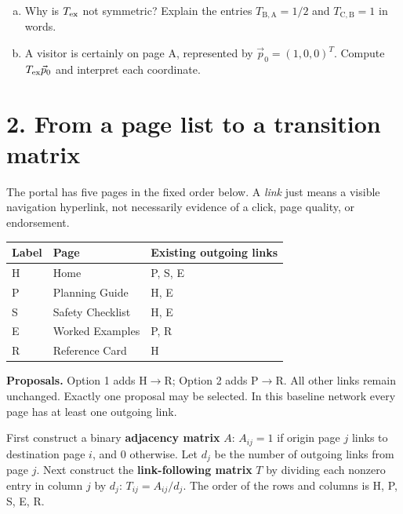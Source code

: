 \documentclass[10pt,letterpaper]{article}
\begin{document}
\begin{enumerate}[a.,leftmargin=*]
\item Why is $T_{\rm ex}$ not symmetric? Explain the entries $T_{\mathrm{B},\mathrm{A}}=1/2$ and $T_{\mathrm{C},\mathrm{B}}=1$ in words.\\[0.36in]
\item A visitor is certainly on page A, represented by $\vec p_0=(1,0,0)^T$. Compute $T_{\rm ex}\vec p_0$ and interpret each coordinate.\\[0.36in]
\end{enumerate}

\newpage
\section*{2. From a page list to a transition matrix}
The portal has five pages in the fixed order below. A \emph{link} just means a visible navigation hyperlink, not necessarily evidence of a click, page quality, or endorsement.
\begin{center}
\begin{tabularx}{\linewidth}{@{}p{0.48in}p{1.55in}Y@{}}
\toprule
Label & Page & Existing outgoing links\\
\midrule
H & Home & P, S, E\\
P & Planning Guide & H, E\\
S & Safety Checklist & H, E\\
E & Worked Examples & P, R\\
R & Reference Card & H\\
\bottomrule
\end{tabularx}
\end{center}
\textbf{Proposals.} Option 1 adds H$\to$R; Option 2 adds P$\to$R. All other links remain unchanged. Exactly one proposal may be selected. In this baseline network every page has at least one outgoing link.

First construct a binary \textbf{adjacency matrix} $A$: $A_{ij}=1$ if origin page $j$ links to destination page $i$, and $0$ otherwise. Let $d_j$ be the number of outgoing links from page $j$. Next construct the \textbf{link-following matrix} $T$ by dividing each nonzero entry in column $j$ by $d_j$: $T_{ij}=A_{ij}/d_j$. The order of the rows and columns is H, P, S, E, R.
\end{document}
